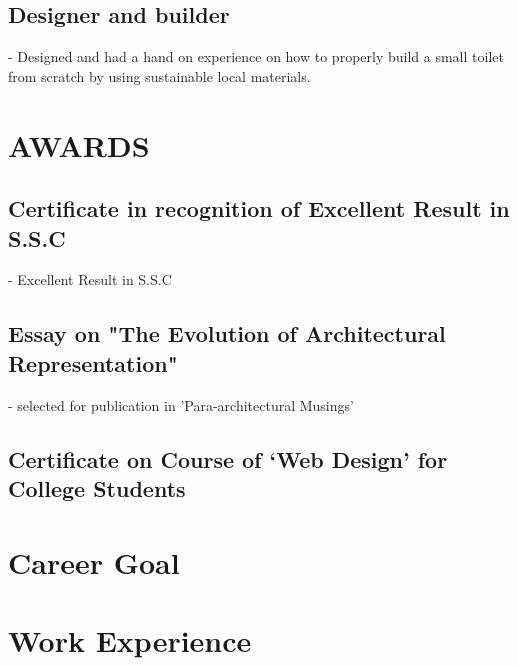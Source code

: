 \begin{minipage}[t]{0.36\textwidth}
    \subsection{Designer and builder}
      - Designed and had a hand on experience on how to properly build a small toilet from scratch by using sustainable local materials.
    \sectionsep

    \section{AWARDS} %
      \subsection{Certificate in recognition of Excellent Result in S.S.C}
      - Excellent Result in S.S.C \newline
      
    \sectionsep
      \subsection{Essay on "The Evolution of Architectural Representation"}
      - selected for publication in 'Para-architectural Musings' \newline
      
    \sectionsep
      \subsection{Certificate on Course of ‘Web Design’ for College Students}
      
    \sectionsep

\end{minipage} \hfill \begin{minipage}[t]{0.63\textwidth}

    \section{Career Goal} 
      \betweensummaryPointsionVSpace
    \sectionsep

  \section{Work Experience}
    

\end{minipage}

